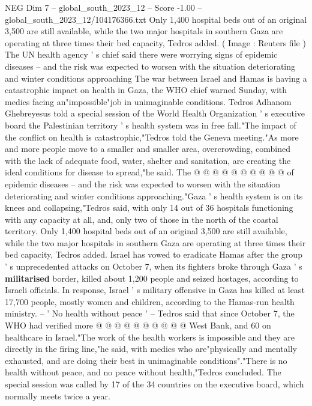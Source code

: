 \begin{textsample}{NEG Dim 7 – global\_south\_2023\_12 – Score -1.00 – global\_south\_2023\_12/104176366.txt}  \label{ex:f7_neg_193}
Only 1,400 hospital beds out of an original 3,500 are still available, while the two major hospitals in southern Gaza are operating at three times their bed capacity, Tedros added. ( Image : Reuters file ) The UN health agency ' s chief said there were worrying signs of epidemic diseases -- and the risk was expected to worsen with the situation deteriorating and winter conditions approaching The war between Israel and Hamas is having a catastrophic impact on health in Gaza, the WHO chief warned Sunday, with medics facing an"impossible"job in unimaginable conditions.
Tedros Adhanom Ghebreyesus told a special session of the World Health Organization ' s executive board the Palestinian territory ' s health system was in free fall."The impact of the conflict on health is catastrophic,"Tedros told the Geneva meeting."As more and more people move to a smaller and smaller area, overcrowding, combined with the lack of adequate food, water, shelter and sanitation, are creating the ideal conditions for disease to spread,"he said.
The @ @ @ @ @ @ @ @ @ @ of epidemic diseases -- and the risk was expected to worsen with the situation deteriorating and winter conditions approaching."Gaza ' s health system is on its knees and collapsing,"Tedros said, with only 14 out of 36 hospitals functioning with any capacity at all, and, only two of those in the north of the coastal territory.
Only 1,400 hospital beds out of an original 3,500 are still available, while the two major hospitals in southern Gaza are operating at three times their bed capacity, Tedros added.
Israel has vowed to eradicate Hamas after the group ' s unprecedented attacks on October 7, when its fighters broke through Gaza ' s \textbf{militarised} border, killed about 1,200 people and seized hostages, according to Israeli officials.
In response, Israel ' s military offensive in Gaza has killed at least 17,700 people, mostly women and children, according to the Hamas-run health ministry. -- ' No health without peace ' -- Tedros said that since October 7, the WHO had verified more @ @ @ @ @ @ @ @ @ @ West Bank, and 60 on healthcare in Israel."The work of the health workers is impossible and they are directly in the firing line,"he said, with medics who are"physically and mentally exhausted, and are doing their best in unimaginable conditions"."There is no health without peace, and no peace without health,"Tedros concluded.
The special session was called by 17 of the 34 countries on the executive board, which normally meets twice a year.

\end{textsample}
